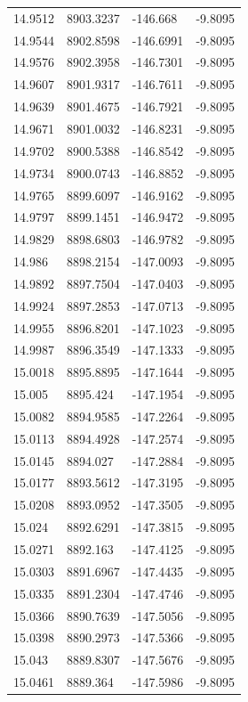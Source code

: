 \begin{table}[H]
\begin{tabular}{llll}
14.9512 & 8903.3237 & -146.668 & -9.8095 \\
14.9544 & 8902.8598 & -146.6991 & -9.8095 \\
14.9576 & 8902.3958 & -146.7301 & -9.8095 \\
14.9607 & 8901.9317 & -146.7611 & -9.8095 \\
14.9639 & 8901.4675 & -146.7921 & -9.8095 \\
14.9671 & 8901.0032 & -146.8231 & -9.8095 \\
14.9702 & 8900.5388 & -146.8542 & -9.8095 \\
14.9734 & 8900.0743 & -146.8852 & -9.8095 \\
14.9765 & 8899.6097 & -146.9162 & -9.8095 \\
14.9797 & 8899.1451 & -146.9472 & -9.8095 \\
14.9829 & 8898.6803 & -146.9782 & -9.8095 \\
14.986 & 8898.2154 & -147.0093 & -9.8095 \\
14.9892 & 8897.7504 & -147.0403 & -9.8095 \\
14.9924 & 8897.2853 & -147.0713 & -9.8095 \\
14.9955 & 8896.8201 & -147.1023 & -9.8095 \\
14.9987 & 8896.3549 & -147.1333 & -9.8095 \\
15.0018 & 8895.8895 & -147.1644 & -9.8095 \\
15.005 & 8895.424 & -147.1954 & -9.8095 \\
15.0082 & 8894.9585 & -147.2264 & -9.8095 \\
15.0113 & 8894.4928 & -147.2574 & -9.8095 \\
15.0145 & 8894.027 & -147.2884 & -9.8095 \\
15.0177 & 8893.5612 & -147.3195 & -9.8095 \\
15.0208 & 8893.0952 & -147.3505 & -9.8095 \\
15.024 & 8892.6291 & -147.3815 & -9.8095 \\
15.0271 & 8892.163 & -147.4125 & -9.8095 \\
15.0303 & 8891.6967 & -147.4435 & -9.8095 \\
15.0335 & 8891.2304 & -147.4746 & -9.8095 \\
15.0366 & 8890.7639 & -147.5056 & -9.8095 \\
15.0398 & 8890.2973 & -147.5366 & -9.8095 \\
15.043 & 8889.8307 & -147.5676 & -9.8095 \\
15.0461 & 8889.364 & -147.5986 & -9.8095 \\

\end{tabular}
\end{table}
